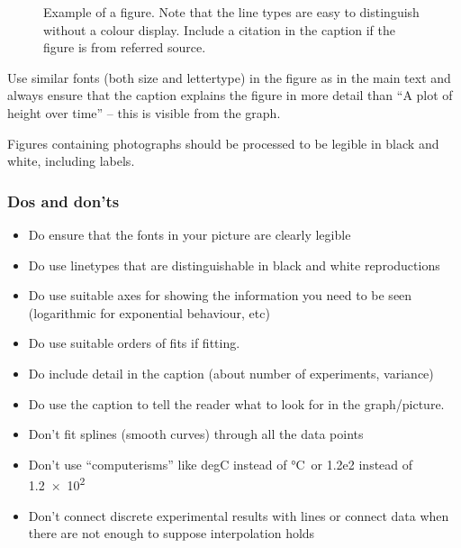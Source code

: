 \documentclass[a5paper, 10pt]{article}
\begin{document}
\begin{figure}[htbp]
  \centering
  \caption{Example of a figure.  Note that the line types are easy to
    distinguish without a colour display.  Include a citation in the caption if the figure is from referred source.}
  \label{fig:figexample}
\end{figure}

Use similar fonts (both size and lettertype) in the figure as in the
main text and always ensure that the caption explains the figure in
more detail than ``A plot of height over time'' -- this is visible from the
graph.

Figures containing photographs should be processed to be legible in
black and white, including labels.

\subsubsection*{Dos and don'ts}
\begin{itemize}
\item Do ensure that the fonts in your picture are clearly legible
\item Do use linetypes that are distinguishable in black and white reproductions
\item Do use suitable axes for showing the information you need to be seen (logarithmic for exponential behaviour, etc)
\item Do use suitable orders of fits if fitting.
\item Do include detail in the caption (about number of experiments, variance)
\item Do use the caption to tell the reader what to look for in the graph/picture.
\end{itemize}

\begin{itemize}
\item Don't fit splines (smooth curves) through all the data points 
\item Don't use ``computerisms'' like degC instead of \si{\celsius}\ or 1.2e2 instead of \num{1.2e2} 
\item Don't connect discrete experimental results with lines or connect data when there are not enough to suppose interpolation holds
\end{itemize}
\end{document}
